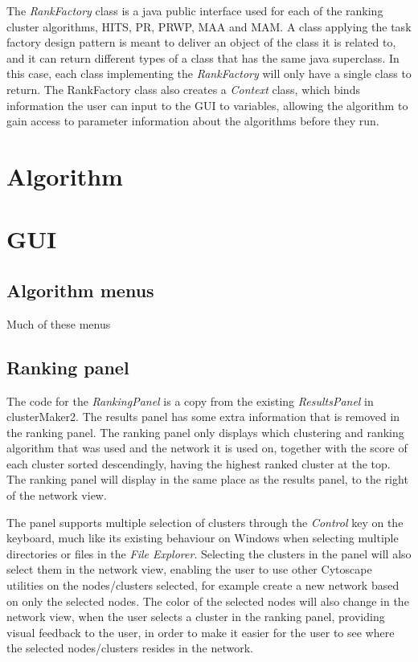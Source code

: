 
The \textit{RankFactory} class is a java public interface used for each of the
ranking cluster algorithms, HITS, PR, PRWP, MAA and MAM. A class applying the
task factory design pattern is meant to deliver an object of the class it is
related to\cite{factory-design}, and it can return different types of a class
that has the same java superclass\cite{java-superclass}. In this case, each
class implementing the \textit{RankFactory} will only have a single class to
return. The RankFactory class also creates a \textit{Context} class, which binds
information the user can input to the GUI to variables, allowing the algorithm
to gain access to parameter information about the algorithms before they run.

\section{Algorithm}
\section{GUI}
\subsection{Algorithm menus}
Much of these menus
\subsection{Ranking panel}
The code for the \textit{RankingPanel} is a copy from the existing
\textit{ResultsPanel} in clusterMaker2. The results panel has some extra
information that is removed in the ranking panel. The ranking panel only
displays which clustering and ranking algorithm that was used and the network it
is used on, together with the score of each cluster sorted descendingly, having
the highest ranked cluster at the top. The ranking panel will display in the
same place as the results panel, to the right of the network view.

The panel supports multiple selection of clusters through the \textit{Control}
key on the keyboard, much like its existing behaviour on Windows when selecting
multiple directories or files in the \textit{File Explorer}. Selecting the
clusters in the panel will also select them in the network view, enabling the
user to use other Cytoscape utilities on the nodes/clusters selected, for
example create a new network based on only the selected nodes. The color of the
selected nodes will also change in the network view, when the user selects a
cluster in the ranking panel, providing visual feedback to the user, in order to
make it easier for the user to see where the selected nodes/clusters resides in
the network.

